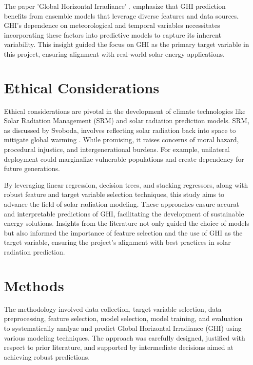 \documentclass[10pt,twocolumn]{article}
\begin{document}
\begin{itemize}
The paper 'Global Horizontal Irradiance' \cite{8}, emphasize that GHI prediction benefits from ensemble models that leverage diverse features and data sources. GHI's dependence on meteorological and temporal variables necessitates incorporating these factors into predictive models to capture its inherent variability. This insight guided the focus on GHI as the primary target variable in this project, ensuring alignment with real-world solar energy applications.
\section{Ethical Considerations}

Ethical considerations are pivotal in the development of climate technologies like Solar Radiation Management (SRM) and solar radiation prediction models. SRM, as discussed by Svoboda, involves reflecting solar radiation back into space to mitigate global warming \cite{11}. While promising, it raises concerns of moral hazard, procedural injustice, and intergenerational burdens. For example, unilateral deployment could marginalize vulnerable populations and create dependency for future generations.




By leveraging linear regression, decision trees, and stacking regressors, along with robust feature and target variable selection techniques, this study aims to advance the field of solar radiation modeling. These approaches ensure accurat and interpretable  predictions of GHI, facilitating the development of sustainable energy solutions. Insights from the literature not only guided the choice of models but also informed the importance of feature selection and the use of GHI as the target variable, ensuring the project's alignment with best practices in solar radiation prediction.






\section{Methods}

The methodology involved data collection, target variable selection, data preprocessing, feature selection, model selection, model training, and evaluation to systematically analyze and predict Global Horizontal Irradiance (GHI) using various modeling techniques. The approach was carefully designed, justified with respect to prior literature, and supported by intermediate decisions aimed at achieving robust predictions.


\end{itemize}
\end{document}
